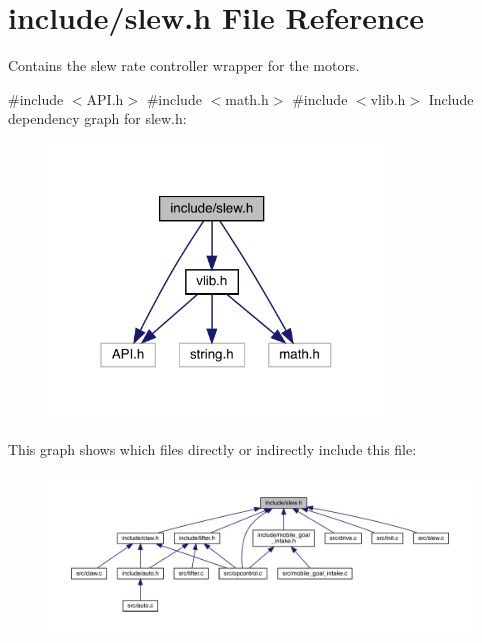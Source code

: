 \section{include/slew.h File Reference}
\label{slew_8h}


Contains the slew rate controller wrapper for the motors.  


{\ttfamily \#include $<$A\+P\+I.\+h$>$}\newline
{\ttfamily \#include $<$math.\+h$>$}\newline
{\ttfamily \#include $<$vlib.\+h$>$}\newline
Include dependency graph for slew.\+h\+:
\nopagebreak
\begin{figure}[H]
\begin{center}
\leavevmode
\includegraphics[width=253pt]{slew_8h__incl}
\end{center}
\end{figure}
This graph shows which files directly or indirectly include this file\+:
\nopagebreak
\begin{figure}[H]
\begin{center}
\leavevmode
\includegraphics[width=350pt]{slew_8h__dep__incl}
\end{center}
\end{figure}
